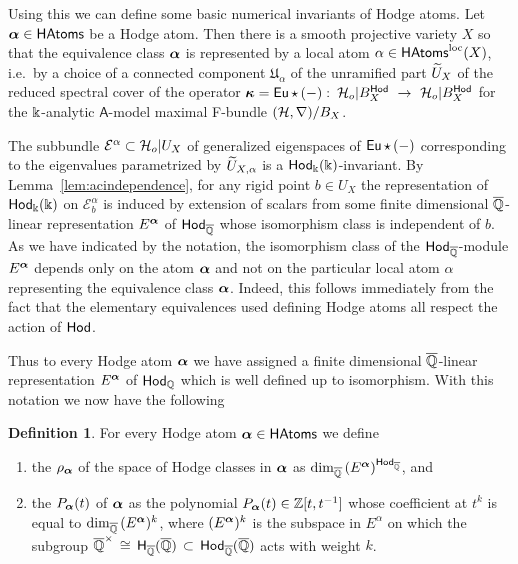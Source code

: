 \documentclass[twoside,leqno]{article}
\numberwithin{equation}{section}
\theoremstyle{plain}
\theoremstyle{definition}
\newtheorem{definition}[equation]{Definition}
\begin{document}
Using this we can define some basic numerical invariants of Hodge atoms. Let $\boldsymbol{\alpha} \in \mathsf{HAtoms}$ be a Hodge atom. Then there is a smooth projective variety $X$ so that  the equivalence class $\boldsymbol{\alpha}$ is represented by a local atom $\alpha \in \mathsf{HAtoms}^{\operatorname{loc}}(X)$, i.e.\ by a choice of a connected component $\mathfrak{U}_{\alpha}$ of  the unramified part $\widetilde U_{X}$ of the reduced spectral cover 
of the operator $\boldsymbol{\kappa} = \operatorname{\mathsf{Eu}}\star \, (-) \, \colon \, \mathcal H_{o}|B^{\mathsf{Hod}}_{X} \ \to \ \mathcal H_{o}|B^{\mathsf{Hod}}_{X}$
for the $\Bbbk$-analytic $\mathsf{A}$-model maximal F-bundle $(\mathcal H,\nabla)/B_{X}$. 

The subbundle $\mathcal{E}^{\alpha} \subset \mathcal H_{o}|U_{X}$ of generalized eigenspaces of $\operatorname{\mathsf{Eu}}\star \, (-)$ corresponding to the eigenvalues parametrized by 
$\widetilde U_{X,\alpha}$ is a $\mathsf{Hod}_{\Bbbk}(\Bbbk)$-invariant. By Lemma~\ref{lem:acindependence}, for any rigid point $b \in U_{X}$ the representation of $\mathsf{Hod}_{\Bbbk}(\Bbbk)$ on $\mathcal{E}^{\alpha}_{b}$ is induced by extension of scalars from some finite dimensional $\overline{\mathbb Q}$-linear representation $E^{\boldsymbol{\alpha}}$ of $\mathsf{Hod}_{\overline{\mathbb Q}}$ whose isomorphism class is independent of $b$. As we have indicated by the notation, the isomorphism class of the $\mathsf{Hod}_{\overline{\mathbb Q}}$-module $E^{\boldsymbol{\alpha}}$ depends only on the atom $\boldsymbol{\alpha}$ and not on the particular local atom $\alpha$ representing the equivalence class $\boldsymbol{\alpha}$. Indeed, this  follows immediately from the fact that the elementary  equivalences used  defining Hodge atoms all respect the action of $\mathsf{Hod}$. 

\medskip

Thus to every Hodge atom $\boldsymbol{\alpha}$  we have assigned  a finite dimensional $\overline{\mathbb Q}$-linear representation $E^{\boldsymbol{\alpha}}$ of $\mathsf{Hod}_{\mathbb Q}$ which is well defined up to isomorphism.
With this notation we now have the following

\begin{definition} \label{def:numinv} For every Hodge atom $\boldsymbol{\alpha} \in \mathsf{HAtoms}$ we define
\begin{enumerate}[wide]
\item the  $\rho_{\boldsymbol{\alpha}}$ of the space of Hodge classes in $\boldsymbol{\alpha}$  as 
$\dim_{\overline{\mathbb Q}} \, (E^{\boldsymbol{\alpha}})^{\mathsf{Hod}_{\overline{\mathbb Q}}}$, and
\item the  $P_{\boldsymbol{\alpha}}(t)$ of $\boldsymbol{\alpha}$ as the polynomial $P_{\boldsymbol{\alpha}}(t) \in \mathbb Z[t,t^{-1}]$ whose coefficient at $t^{k}$ is equal to 
$\dim_{\overline{\mathbb Q}} \, (E^{\boldsymbol{\alpha}})^{k}$, where $(E^{\boldsymbol{\alpha}})^{k}$ is the subspace in $E^{\alpha}$ on which the subgroup $\overline{\mathbb Q}^{\times} \, \cong \, \mathsf{H}_{\overline{\mathbb Q}}(\overline{\mathbb Q}) \, \subset \,  \mathsf{Hod}_{\overline{\mathbb Q}}(\overline{\mathbb Q})$ acts with weight $k$.
\end{enumerate}
\end{definition}
\end{document}
